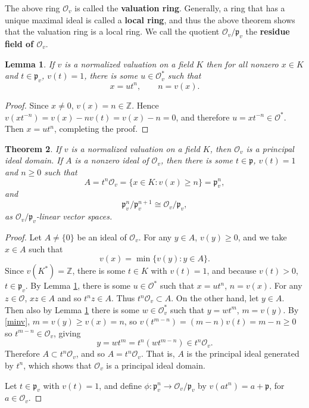 \documentclass{article}
\newtheorem{theorem}{Theorem}
\newtheorem{lemma}[theorem]{Lemma}
\theoremstyle{definition}
\begin{document}
The above ring $\mathcal{O}_v$
is called the \textbf{valuation ring}. Generally, a ring that has a unique maximal ideal is called a \textbf{local ring}, and thus the above
theorem shows that the valuation ring is a local ring.
We call the quotient $\mathcal{O}_v / \mathfrak{p}_v$ the \textbf{residue field of $\mathcal{O}_v$}. 


\begin{lemma}
If $v$ is a normalized valuation on a field $K$ then for all nonzero $x \in K$
and $t \in \mathfrak{p}_v$, $v(t)=1$,
there is some $u \in \mathcal{O}_v^*$ such that
\[
x=ut^n, \qquad n = v(x).
\]
\label{utnlemma}
\end{lemma}
\begin{proof}
Since $x \neq 0$, $v(x) =n \in \mathbb{Z}$. 
Hence $v(xt^{-n})=v(x)-nv(t)=v(x)-n=0$, and therefore
$u=xt^{-n}  \in \mathcal{O}^*$. Then $x=ut^n$, completing the proof.
\end{proof}







\begin{theorem}
If $v$ is a normalized valuation on a field $K$, then $\mathcal{O}_v$ is a principal
ideal domain. If $A$ is a nonzero ideal of $\mathcal{O}_v$, then there is some
$t \in \mathfrak{p}$, $v(t)=1$ and $n \geq 0$ such that 
\[
A = t^n \mathcal{O}_v = \{x \in K: v(x) \geq n\}=\mathfrak{p}_v^n,
\]
and
\[
\mathfrak{p}_v^n/ \mathfrak{p}_v^{n+1} \cong \mathcal{O}_v / \mathfrak{p}_v,
\]
as $ \mathcal{O}_v / \mathfrak{p}_v$-linear vector spaces.
\end{theorem}
\begin{proof}
Let $A \neq \{0\}$ be an ideal of $\mathcal{O}_v$. For any $y \in A$, $v(y) \geq 0$, and we take
$x \in A$ such that
\begin{equation}
v(x) = \min\{v(y): y \in A\}.
\label{minv}
\end{equation}
Since
$v(K^*)=\mathbb{Z}$,  there is  some $t \in K$ with
$v(t)=1$, and because $v(t)>0$, $t \in \mathfrak{p}_v$. 
By Lemma \ref{utnlemma}, there is some $u \in \mathcal{O}^*$ such that
$x=ut^n$, $n=v(x)$. 
For any $z \in \mathcal{O}$, $xz \in A$ and so $t^nz \in A$. Thus $t^n \mathcal{O}_v \subset A$. 
On the other hand, let $y \in A$. Then also by Lemma \ref{utnlemma} there is some $w \in \mathcal{O}_v^*$
such that $y=wt^m$, $m=v(y)$. By \eqref{minv}, $m=v(y) \geq v(x) = n$, so $v(t^{m-n})=(m-n)v(t)=m-n \geq 0$
so $t^{m-n} \in \mathcal{O}_v$, giving
\[
y=wt^m = t^n (wt^{m-n})  \in t^n \mathcal{O}_v.
\]
Therefore $A \subset t^n\mathcal{O}_v$, and so $A=t^n \mathcal{O}_v$. That is, $A$ is the principal ideal generated by $t^n$,
which shows that $\mathcal{O}_v$ is a principal ideal domain. 

Let $t \in \mathfrak{p}_v$ with $v(t)=1$, and 
define $\phi:\mathfrak{p}_v^n \to \mathcal{O}_v / \mathfrak{p}_v$ by
$v(at^n) = a+\mathfrak{p}$, for $a \in \mathcal{O}_v$. 
\end{proof}
\end{document}
